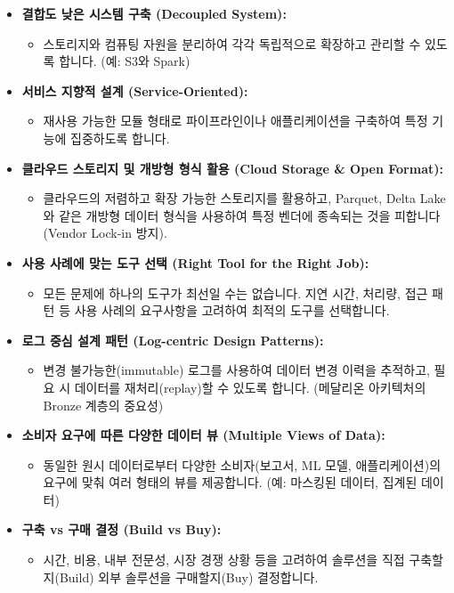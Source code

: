 \documentclass[11pt,a4paper]{article}
\begin{document}
\begin{itemize}
    \item \textbf{결합도 낮은 시스템 구축 (Decoupled System):}
    \begin{itemize}
        \item 스토리지와 컴퓨팅 자원을 분리하여 각각 독립적으로 확장하고 관리할 수 있도록 합니다. (예: S3와 Spark)
    \end{itemize}
    \item \textbf{서비스 지향적 설계 (Service-Oriented):}
    \begin{itemize}
        \item 재사용 가능한 모듈 형태로 파이프라인이나 애플리케이션을 구축하여 특정 기능에 집중하도록 합니다.
    \end{itemize}
    \item \textbf{클라우드 스토리지 및 개방형 형식 활용 (Cloud Storage & Open Format):}
    \begin{itemize}
        \item 클라우드의 저렴하고 확장 가능한 스토리지를 활용하고, Parquet, Delta Lake와 같은 개방형 데이터 형식을 사용하여 특정 벤더에 종속되는 것을 피합니다 (Vendor Lock-in 방지).
    \end{itemize}
    \item \textbf{사용 사례에 맞는 도구 선택 (Right Tool for the Right Job):}
    \begin{itemize}
        \item 모든 문제에 하나의 도구가 최선일 수는 없습니다. 지연 시간, 처리량, 접근 패턴 등 사용 사례의 요구사항을 고려하여 최적의 도구를 선택합니다.
    \end{itemize}
    \item \textbf{로그 중심 설계 패턴 (Log-centric Design Patterns):}
    \begin{itemize}
        \item 변경 불가능한(immutable) 로그를 사용하여 데이터 변경 이력을 추적하고, 필요 시 데이터를 재처리(replay)할 수 있도록 합니다. (메달리온 아키텍처의 Bronze 계층의 중요성)
    \end{itemize}
    \item \textbf{소비자 요구에 따른 다양한 데이터 뷰 (Multiple Views of Data):}
    \begin{itemize}
        \item 동일한 원시 데이터로부터 다양한 소비자(보고서, ML 모델, 애플리케이션)의 요구에 맞춰 여러 형태의 뷰를 제공합니다. (예: 마스킹된 데이터, 집계된 데이터)
    \end{itemize}
    \item \textbf{구축 vs 구매 결정 (Build vs Buy):}
    \begin{itemize}
        \item 시간, 비용, 내부 전문성, 시장 경쟁 상황 등을 고려하여 솔루션을 직접 구축할지(Build) 외부 솔루션을 구매할지(Buy) 결정합니다.
    \end{itemize}
\end{itemize}
\end{document}
